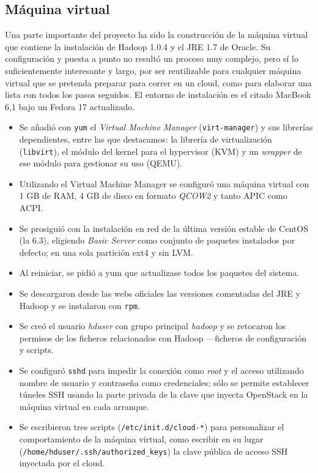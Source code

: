 \subsection{M\'aquina virtual}\label{subsec:maquinavirtual}
\noindent Una parte importante del proyecto ha sido la construcci\'on de la m\'aquina virtual que contiene la instalaci\'on de Hadoop 1.0.4 y el JRE 1.7 de Oracle. Su configuraci\'on y puesta a punto no result\'o un proceso muy complejo, pero s\'i lo suficientemente interesante y largo, por ser reutilizable para cualquier m\'aquina virtual que se pretenda preparar para correr en un cloud, como para elaborar una lista con todos los pasos seguidos. El entorno de instalaci\'on es el citado MacBook 6,1 bajo un Fedora 17 actualizado.
\begin{itemize}
    \item Se a\~nadi\'o con \texttt{yum} el \emph{Virtual Machine Manager} (\texttt{virt-manager}) y sus librer\'ias dependientes, entre las que destacamos: la librer\'ia de vir\-tua\-li\-za\-ci\'on (\texttt{libvirt}), el m\'odulo del kernel para el hypervisor (KVM) y un \emph{wrapper} de ese m\'odulo para gestionar su uso (QEMU).
 \item Utilizando el Virtual Machine Manager se configur\'o una m\'aquina virtual con 1 GB de RAM, 4 GB de disco en formato \emph{QCOW2} y tanto APIC como ACPI.
 \item Se prosigui\'o con la instalaci\'on en red de la \'ultima versi\'on estable de CentOS (la 6.3), eligiendo \emph{Basic Server} como conjunto de paquetes instalados por defecto; en una sola partici\'on ext4 y sin LVM.
 \item Al reiniciar, se pidi\'o a yum que actualizase todos los paquetes del sistema.
 \item Se descargaron desde las webs oficiales las versiones comentadas del JRE y Hadoop y se instalaron con \texttt{rpm}.
 \item Se cre\'o el usuario \emph{hduser} con grupo principal \emph{hadoop} y se retocaron los permisos de los ficheros relacionados con Hadoop ---ficheros de con\-fi\-gu\-ra\-ci\'on y scripts.
 \item Se configur\'o \texttt{sshd} para impedir la conexi\'on como \emph{root} y el acceso utilizando nombre de usuario y contrase\~na como credenciales; s\'olo se permite establecer t\'uneles SSH usando la parte privada de la clave que inyecta OpenStack en la m\'aquina virtual en cada arranque.
 \item Se escribieron tres scripts (\texttt{/etc/init.d/cloud-*}) para personalizar el comportamiento de la m\'aquina virtual, como escribir en su lugar (\texttt{/home/hduser/.ssh/authorized\_keys}) la clave p\'ublica de acceso SSH inyectada por el cloud.

\end{itemize}
